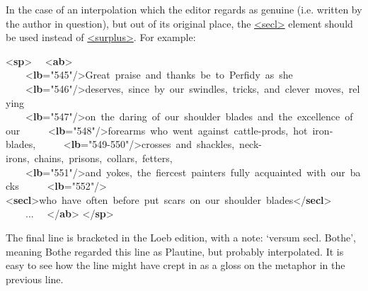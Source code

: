 In the case of an interpolation which the editor regards as genuine (i.e. written by the author in question), but out of its original place, the \hyperref[TEI.secl]{<secl>} element should be used instead of \hyperref[TEI.surplus]{<surplus>}. For example: \par\bgroup{}\exampleFont \begin{shaded}\noindent\mbox{}\newline
{<\textbf{sp}>}\newline
  {<\textbf{ab}>}\newline
    {<\textbf{lb}\hspace*{1em}{n}="{545}"/>}Great praise and thanks be to Perfidy as she\newline
    {<\textbf{lb}\hspace*{1em}{n}="{546}"/>}deserves, since by our swindles, tricks, and clever moves, relying \newline
    {<\textbf{lb}\hspace*{1em}{n}="{547}"/>}on the daring of our shoulder blades and the excellence of our \newline
    {<\textbf{lb}\hspace*{1em}{n}="{548}"/>}forearms who went against cattle-prods, hot iron-blades, \newline
    {<\textbf{lb}\hspace*{1em}{n}="{549-550}"/>}crosses and shackles, neck-irons, chains, prisons, collars, fetters, \newline
    {<\textbf{lb}\hspace*{1em}{n}="{551}"/>}and yokes, the fiercest painters fully acquainted with our backs \newline
    {<\textbf{lb}\hspace*{1em}{n}="{552}"/>}{<\textbf{secl}>}who have often before put scars on our shoulder blades{</\textbf{secl}>}\newline
    ...\newline
  {</\textbf{ab}>}\newline
{</\textbf{sp}>}\newline
           \end{shaded}\egroup\par \noindent  The final line is bracketed in the Loeb edition, with a note: ‘versum secl. Bothe’, meaning Bothe regarded this line as Plautine, but probably interpolated. It is easy to see how the line might have crept in as a gloss on the metaphor in the previous line.\par

